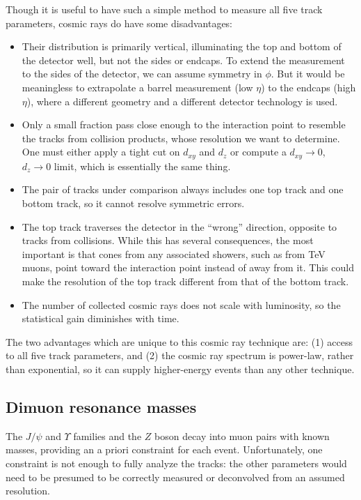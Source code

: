 \documentclass[12pt]{article}
\begin{document}
Though it is useful to have such a simple method to measure all five
track parameters, cosmic rays do have some disadvantages:
\begin{itemize}
\item Their distribution is primarily vertical, illuminating the top
  and bottom of the detector well, but not the sides or endcaps.  To
  extend the measurement to the sides of the detector, we can assume
  symmetry in $\phi$.  But it would be meaningless to extrapolate a
  barrel measurement (low $\eta$) to the endcaps (high $\eta$), where
  a different geometry and a different detector technology is used.
\item Only a small fraction pass close enough to the interaction point
  to resemble the tracks from collision products, whose resolution we
  want to determine.  One must either apply a tight cut on $d_{xy}$
  and $d_z$ or compute a $d_{xy} \to 0$, $d_z \to 0$ limit, which is
  essentially the same thing.
\item The pair of tracks under comparison always includes one top
  track and one bottom track, so it cannot resolve symmetric errors.
\item The top track traverses the detector in the ``wrong'' direction,
  opposite to tracks from collisions.  While this has several
  consequences, the most important is that cones from any associated
  showers, such as from TeV muons, point toward the interaction point
  instead of away from it.  This could make the resolution of the top
  track different from that of the bottom track.
\item The number of collected cosmic rays does not scale with
  luminosity, so the statistical gain diminishes with time.
\end{itemize}

The two advantages which are unique to this cosmic ray technique are:
(1) access to all five track parameters, and (2) the cosmic ray
spectrum is power-law, rather than exponential, so it can supply
higher-energy events than any other technique.

\subsection{Dimuon resonance masses}

The $J/\psi$ and $\Upsilon$ families and the $Z$ boson decay into muon
pairs with known masses, providing an a priori constraint for each
event.  Unfortunately, one constraint is not enough to fully analyze
the tracks: the other parameters would need to be presumed to be
correctly measured or deconvolved from an assumed resolution.
\end{document}
